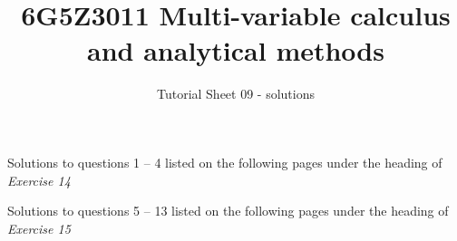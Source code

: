 \documentclass[a4paper]{amsart}
\begin{document}
\title{6G5Z3011 Multi-variable calculus and analytical methods}
\author{Tutorial Sheet 09 - solutions}
\maketitle

Solutions to questions 1 -- 4 listed on the following pages under the heading of \textit{Exercise 14}

Solutions to questions 5 -- 13 listed on the following pages under the heading of \textit{Exercise 15}



\end{document}

